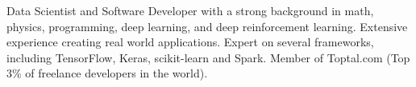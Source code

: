 \small{Data Scientist and Software Developer with a strong background in math, physics, programming, deep learning, and deep reinforcement learning. Extensive experience creating real world applications. Expert on several frameworks, including TensorFlow, Keras, scikit-learn and Spark. Member of Toptal.com (Top 3\% of freelance developers in the world).}